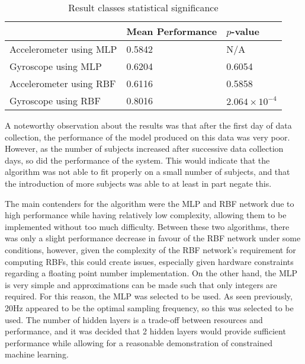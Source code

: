 \begin{table}
	\centering
	\begin{tabular}{l|ll}
		& Mean Performance & $p$-value \\
		\hline
		Accelerometer using MLP & 0.5842 & N/A \\
		Gyroscope using MLP     & 0.6204 & 0.6054 \\
		Accelerometer using RBF & 0.6116 & 0.5858 \\
		Gyroscope using RBF     & 0.8016 & $2.064 \times 10^{-4}$ \\        
	\end{tabular}
	\caption{Result classes statistical significance \label{tab:res-ttest}}
\end{table}

A noteworthy observation about the results was that after the first day of data collection, the performance of the model produced on this data was very poor. However, as the number of subjects increased after successive data collection days, so did the performance of the system. This would indicate that the algorithm was not able to fit properly on a small number of subjects, and that the introduction of more subjects was able to at least in part negate this.

The main contenders for the algorithm were the MLP and RBF network due to high performance while having relatively low complexity, allowing them to be implemented without too much difficulty. Between these two algorithms, there was only a slight performance decrease in favour of the RBF network under some conditions, however, given the complexity of the RBF network's requirement for computing RBFs, this could create issues, especially given hardware constraints regarding a floating point number implementation. On the other hand, the MLP is very simple and approximations can be made such that only integers are required. For this reason, the MLP was selected to be used. As seen previously, 20Hz appeared to be the optimal sampling frequency, so this was selected to be used. The number of hidden layers is a trade-off between resources and performance, and it was decided that 2 hidden layers would provide sufficient performance while allowing for a reasonable demonstration of constrained machine learning.